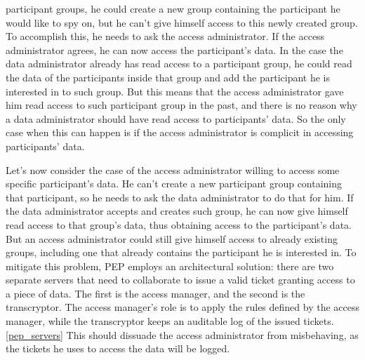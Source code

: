\documentclass{report}
\begin{document}
participant groups, he could create a new group containing the participant he would like to spy on, but he can't give himself access to this newly created group. To accomplish this, he needs to 
ask the access administrator. If the access administrator agrees, he can now access the participant's data. In the case the data administrator already has read access to a participant 
group, he could read the data of the participants inside that group and add the participant he is interested in to such group. But this means that the access administrator gave him 
read access to such participant group in the past, and there is no reason why a data administrator should have read access to participants' data. So the only case when this can happen 
is if the access administrator is complicit in accessing participants' data. \par
Let's now consider the case of the access administrator willing to access some specific participant's data. 
He can't create a new participant group containing that participant, so he needs to ask the data administrator to do that for him. If the data administrator accepts and creates such 
group, he can now give himself read access to that group's data, thus obtaining access to the participant's data. But an access administrator could still give himself access to already 
existing groups, including one that already contains the participant he is interested in. To mitigate this problem, PEP employs an architectural solution: there are two separate
servers that need to collaborate to issue a valid ticket granting access to a piece of data. The first is the access manager, and the second is the transcryptor. The access manager's 
role is to apply the rules defined by the access manager, while the transcryptor keeps an auditable log of the issued tickets.\ref{pep_servers} This should dissuade the access 
administrator from misbehaving, as the tickets he uses to access the data will be logged.
\end{document}
